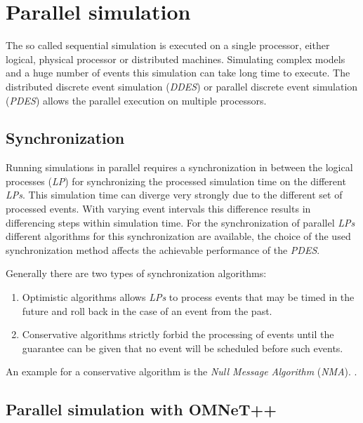 \chapter{Parallel simulation}
\label{cha:parallel_sim}
The so called sequential simulation is executed on a single processor, either logical, physical processor or distributed machines.
Simulating complex models and a huge number of events this simulation can take long time to execute.
The distributed discrete event simulation (\emph{DDES}) or parallel discrete event simulation (\emph{PDES}) allows the parallel execution on multiple processors.


\section{Synchronization}
\label{sec:parallel_synchronization}
Running simulations in parallel requires a synchronization in between the logical processes (\emph{LP}) for synchronizing the processed simulation time on the different \emph{LPs}.
This simulation time can diverge very strongly due to the different set of processed events.
With varying event intervals this difference results in differencing steps within simulation time.
For the synchronization of parallel \emph{LPs} different algorithms for this synchronization are available, the choice of the used synchronization method affects the achievable performance of the \emph{PDES}.

Generally there are two types of synchronization algorithms:

\begin{enumerate}
    \item Optimistic algorithms allows \emph{LPs} to process events that may be timed in the future and roll back in the case of an event from the past.
    \item Conservative algorithms strictly forbid the processing of events until the guarantee can be given that no event will be scheduled before such events. \cite[chapter 2]{bagrodia_performance_2000}
\end{enumerate}

An example for a conservative algorithm is the \emph{Null Message Algorithm} (\emph{NMA}). \cite[section 2.1]{bagrodia_performance_2000} \cite{Varga03apractical}.

\section{Parallel simulation with OMNeT++}
\label{sec:parallel_omnet}

